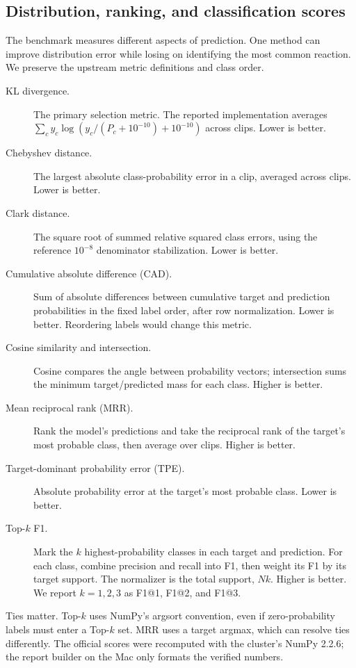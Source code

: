 \documentclass[11pt,a4paper]{article}
\begin{document}
\subsection{Distribution, ranking, and classification scores}
The benchmark measures different aspects of prediction. One method can improve distribution error while losing on identifying the most common reaction. We preserve the upstream metric definitions and class order.

\begin{description}
\item[KL divergence.] The primary selection metric. The reported implementation averages $\sum_c y_c\log(y_c/(P_c+10^{-10})+10^{-10})$ across clips. Lower is better.
\item[Chebyshev distance.] The largest absolute class-probability error in a clip, averaged across clips. Lower is better.
\item[Clark distance.] The square root of summed relative squared class errors, using the reference $10^{-8}$ denominator stabilization. Lower is better.
\item[Cumulative absolute difference (CAD).] Sum of absolute differences between cumulative target and prediction probabilities in the fixed label order, after row normalization. Lower is better. Reordering labels would change this metric.
\item[Cosine similarity and intersection.] Cosine compares the angle between probability vectors; intersection sums the minimum target/predicted mass for each class. Higher is better.
\item[Mean reciprocal rank (MRR).] Rank the model's predictions and take the reciprocal rank of the target's most probable class, then average over clips. Higher is better.
\item[Target-dominant probability error (TPE).] Absolute probability error at the target's most probable class. Lower is better.
\item[Top-$k$ F1.] Mark the $k$ highest-probability classes in each target and prediction. For each class, combine precision and recall into F1, then weight its F1 by its target support. The normalizer is the total support, $Nk$. Higher is better. We report $k=1,2,3$ as F1@1, F1@2, and F1@3.
\end{description}

Ties matter. Top-$k$ uses NumPy's argsort convention, even if zero-probability labels must enter a Top-$k$ set. MRR uses a target argmax, which can resolve ties differently. The official scores were recomputed with the cluster's NumPy 2.2.6; the report builder on the Mac only formats the verified numbers.
\end{document}
